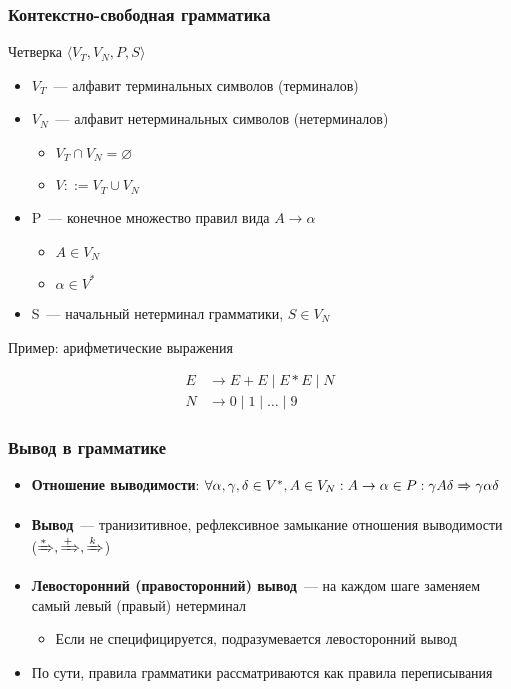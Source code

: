 \documentclass{beamer}
\newcommand{\derives}[1][*]{\xRightarrow[]{#1}}
\begin{document}
\begin{frame}[fragile]
  \transwipe[direction=90]
  \frametitle{Контекстно-свободная грамматика}
  
  \begin{center}
    Четверка $\langle V_T, V_N, P, S \rangle$
  \end{center}

   \begin{itemize}
     \item $V_T$~--- алфавит терминальных символов (терминалов) 
     \item $V_N$~--- алфавит нетерминальных символов (нетерминалов)
     \begin{itemize} 
        \item $V_T \cap V_N = \varnothing$ 
        \item $V ::= V_T \cup V_N$
     \end{itemize}
     \item P~--- конечное множество правил вида $A \to \alpha$
     \begin{itemize}
       \item $A \in V_N $
       \item $\alpha \in V^*$
     \end{itemize}  
     \item S~--- начальный нетерминал грамматики, $S  \in V_N$
  \end{itemize}

\vfill

\begin{center}
  Пример: арифметические выражения
\end{center}
\begin{align*}
  E &\to E + E \mid E * E \mid N \\ 
  N &\to 0 \mid 1 \mid \dots \mid 9 
\end{align*}
\end{frame}

\begin{frame}[fragile]
  \transwipe[direction=90]
  \frametitle{Вывод в грамматике}
  \begin{itemize}
    \item \textbf{Отношение выводимости}: $\forall \alpha, \gamma, \delta \in V^*, A \in V_N: A \to \alpha \in P: \gamma A \delta \derives[] \gamma \alpha \delta$
    \item \textbf{Вывод}~--- транизитивное, рефлексивное замыкание отношения выводимости ($\derives, \derives[+], \derives[k]$)
    \item \textbf{Левосторонний (правосторонний) вывод}~--- на каждом шаге заменяем самый левый (правый) нетерминал
    \begin{itemize}
      \item Если не специфицируется, подразумевается левосторонний вывод
    \end{itemize}
    \item По сути, правила грамматики рассматриваются как правила переписывания
  \end{itemize}
\end{frame}
\end{document}
